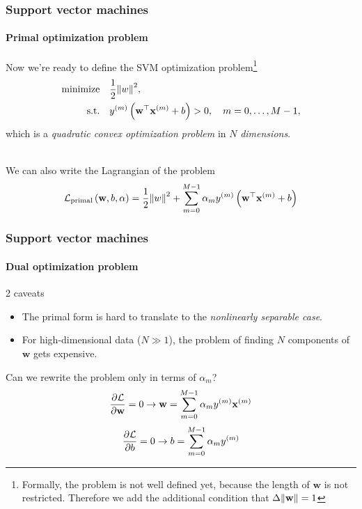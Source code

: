\documentclass[aspectratio=43]{beamer}
\begin{document}
\begin{frame}
  \frametitle{Support vector machines}
  \framesubtitle{Primal optimization problem}

  Now we're ready to define the SVM optimization problem\footnote{Formally, the problem is not well defined yet, because the length of $\mathbf{{w}}$ is not restricted. Therefore we add the additional condition that $\Delta \norm{\mathbf{w}}=1$}
  \begin{align*}
    \mathrm{minimize}& \quad\frac{1}{2}\norm{w}^2,\\
    \mathrm{s.t.}& \quad y^{\left( m \right)}\left( \mathbf{w}^\top \mathbf{x}^{(m)} + b\right) > 0, \quad m={0,\dots, M-1},
  \end{align*}
  which is a \emph{quadratic convex optimization problem} in $N$ \emph{dimensions}.

  \ \\
  We can also write the Lagrangian of the problem
  \[\mathcal{L}_{\mathrm{primal}}\left( \mathbf{w}, b, \mathbf{\alpha} \right) = \frac{1}{2}\norm{w}^2 + \sum_{m=0}^{M-1} \alpha_m y^{\left( m \right)}\left( \mathbf{w}^\top \mathbf{x}^{(m)} + b\right) \]

\end{frame}


\begin{frame}
  \frametitle{Support vector machines}
  \framesubtitle{Dual optimization problem}

  2 caveats
  \begin{itemize}
    \item The primal form is hard to translate to the \emph{nonlinearly separable case}.
    \item For high-dimensional data ($N \gg 1$), the problem of finding $N$ components of $\mathbf{w}$ gets expensive.
  \end{itemize}

  Can we rewrite the problem only in terms of $\alpha_m$?
  \[\pdv{\mathcal{L}}{\mathbf{w}}=0 \rightarrow \mathbf{w} = \sum_{m=0}^{M-1} \alpha_m y^{(m)}\mathbf{x}^{(m)}\]
  \[\pdv{\mathcal{L}}{b}=0 \rightarrow b = \sum_{m=0}^{M-1} \alpha_m y^{(m)}\]

\end{frame}
\end{document}
